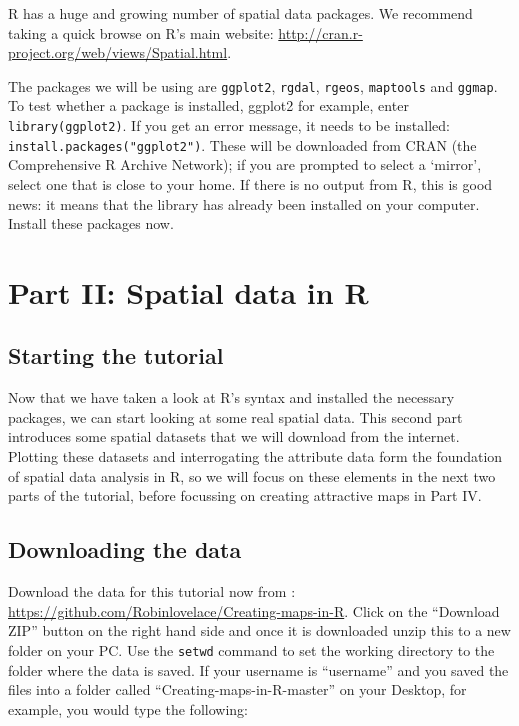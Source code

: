 \documentclass[]{article}
\begin{document}
R has a huge and growing number of spatial data packages. We recommend
taking a quick browse on R's main website:
\href{http://cran.r-project.org/web/views/Spatial.html}{http://cran.r-project.org/web/views/Spatial.html}.

The packages we will be using are \texttt{ggplot2}, \texttt{rgdal},
\texttt{rgeos}, \texttt{maptools} and \texttt{ggmap}. To test whether a
package is installed, ggplot2 for example, enter
\texttt{library(ggplot2)}. If you get an error message, it needs to be
installed: \texttt{install.packages("ggplot2")}. These will be
downloaded from CRAN (the Comprehensive R Archive Network); if you are
prompted to select a `mirror', select one that is close to your home. If
there is no output from R, this is good news: it means that the library
has already been installed on your computer. Install these packages now.

\section{Part II: Spatial data in R}

\subsection{Starting the tutorial}

Now that we have taken a look at R's syntax and installed the necessary
packages, we can start looking at some real spatial data. This second
part introduces some spatial datasets that we will download from the
internet. Plotting these datasets and interrogating the attribute data
form the foundation of spatial data analysis in R, so we will focus on
these elements in the next two parts of the tutorial, before focussing
on creating attractive maps in Part IV.

\subsection{Downloading the data}

Download the data for this tutorial now from :
\href{https://github.com/Robinlovelace/Creating-maps-in-R}{https://github.com/Robinlovelace/Creating-maps-in-R}.
Click on the ``Download ZIP'' button on the right hand side and once it
is downloaded unzip this to a new folder on your PC. Use the
\texttt{setwd} command to set the working directory to the folder where
the data is saved. If your username is ``username'' and you saved the
files into a folder called ``Creating-maps-in-R-master'' on your
Desktop, for example, you would type the following:
\end{document}
